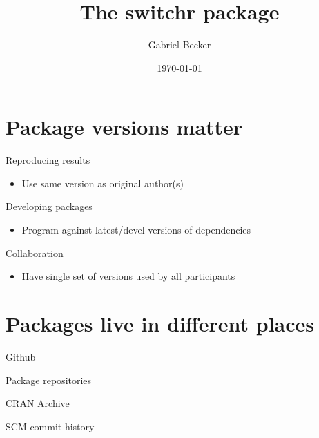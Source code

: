 \documentclass[presentation]{beamer}
\author{Gabriel Becker}
\date{\today}
\title{The switchr package}
\begin{document}
\maketitle



\section{Package versions matter}
\label{sec-1}

\begin{frame}[label=sec-1-1]{Reproducing results}
\begin{itemize}
\item Use same version as original author(s)
\end{itemize}
\end{frame}
\begin{frame}[label=sec-1-2]{Developing packages}
\begin{itemize}
\item Program against latest/devel versions of dependencies
\end{itemize}
\end{frame}
\begin{frame}[label=sec-1-3]{Collaboration}
\begin{itemize}
\item Have single set of versions used by all participants
\end{itemize}
\end{frame}

\section{Packages live in different places}
\label{sec-2}
\begin{frame}[label=sec-2-1]{Github}
\end{frame}
\begin{frame}[label=sec-2-2]{Package repositories}
\end{frame}
\begin{frame}[label=sec-2-3]{CRAN Archive}
\end{frame}
\begin{frame}[label=sec-2-4]{SCM commit history}
\end{frame}
\end{document}
